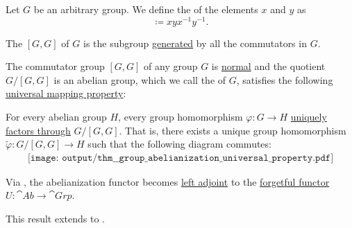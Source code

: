 \begin{definition}\label{def:group_commutator}
  Let \( G \) be an arbitrary group. We define the  of the elements \( x \) and \( y \) as
  \begin{equation*}
    [x, y] \coloneqq xyx^{-1}y^{-1}.
  \end{equation*}

  The  \( [G, G] \) of \( G \) is the subgroup \hyperref[def:group/submodel]{generated} by all the commutators in \( G \).
\end{definition}

\begin{proposition}\label{thm:group_abelianization_universal_property}
  The commutator group \( [G, G] \) of any group \( G \) is \hyperref[thm:normal_subgroup_equivalences]{normal} and the quotient \( G / [G, G] \) is an abelian group, which we call the  of \( G \), satisfies the following \hyperref[rem:universal_mapping_property]{universal mapping property}:
  \begin{displayquote}
    For every abelian group \( H \), every group homomorphism \( \varphi: G \to H \) \hyperref[def:factors_through]{uniquely factors through} \( G / [G, G] \). That is, there exists a unique group homomorphism \( \widetilde{\varphi}: G / [G, G] \to H \) such that the following diagram commutes:
    \begin{equation}\label{eq:thm:group_abelianization_universal_property/diagram}
      \begin{aligned}
        \texttt{[image: output/thm\_\_group\_abelianization\_universal\_property.pdf]}
      \end{aligned}
    \end{equation}
  \end{displayquote}

  Via , the abelianization functor becomes \hyperref[def:category_adjunction]{left adjoint} to the \hyperref[def:concrete_category]{forgetful functor} \( U: \cat{Ab} \to \cat{Grp} \).

  This result extends to .
\end{proposition}
